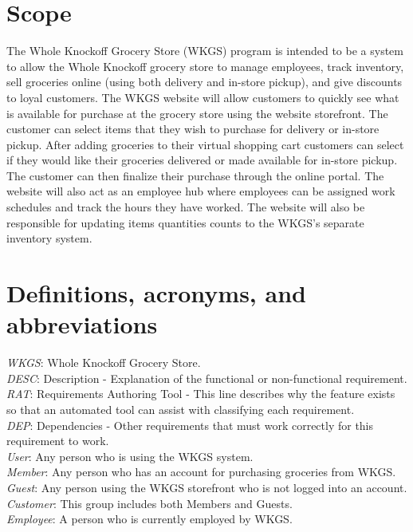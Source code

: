 \documentclass{scrreprt}
\theoremstyle{funreq}
\begin{document}
\section{Scope}
The Whole Knockoff Grocery Store (WKGS) program is intended to be a system to allow the Whole Knockoff grocery store to manage employees, track inventory, sell groceries online (using both delivery and in-store pickup), and give discounts to loyal customers.  The WKGS website will allow customers to quickly see what is available for purchase at the grocery store using the website storefront.  The customer can select items that they wish to purchase for delivery or in-store pickup.  After adding groceries to their virtual shopping cart customers can select if they would like their groceries delivered or made available for in-store pickup.  The customer can then finalize their purchase through the online portal.  The website will also act as an employee hub where employees can be assigned work schedules and track the hours they have worked. The website will also be responsible for updating items quantities counts to the WKGS's separate inventory system.

\section{Definitions, acronyms, and abbreviations}
\textit{WKGS}: Whole Knockoff Grocery Store.\\
\textit{DESC}: Description - Explanation of the functional or non-functional requirement.\\
\textit{RAT}: Requirements Authoring Tool - This line describes why the feature exists so that an automated tool can assist with classifying each requirement.\\
\textit{DEP}: Dependencies - Other requirements that must work correctly for this requirement to work.\\
\textit{User}: Any person who is using the WKGS system.\\
\textit{Member}: Any person who has an account for purchasing groceries from WKGS.\\
\textit{Guest}: Any person using the WKGS storefront who is not logged into an account.\\
\textit{Customer}: This group includes both Members and Guests.\\
\textit{Employee}: A person who is currently employed by WKGS.\\
\end{document}
